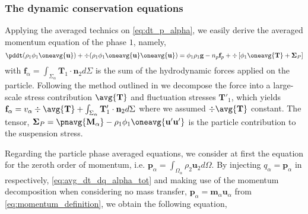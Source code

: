 \subsubsection{The dynamic conservation equations}

Applying the averaged technics on \ref{eq:dt_p_alpha}, we easily derive the averaged momentum  equation of the phase $1$, namely,
\begin{equation}
    \pddt (\rho_1\phi_1\oneavg{\textbf{u}})
    +  \div (\rho_1\phi_1\oneavg{\textbf{u}} \oneavg{\textbf{u}})
    = 
     \phi_1 \rho_1 \textbf{g}
    - n_p\textbf{f}_p
    +  \div \left[
        \phi_1\oneavg{ \textbf{T}}
        + \mathbf{\Sigma}_P
    \right]
    \label{eq:hybrid_avg_dt_rhou}
\end{equation}
with $\textbf{f}_\alpha = \int_{\Sigma_\alpha} \mathbf{T}_1 \cdot \textbf{n}_2d\Sigma$ is the sum of the hydrodynamic forces applied on the particle. 
Following the method outlined in \citet{chu2016flux} we decompose the force into a large-scale stress contribution $\avg{\textbf{T}}$ and fluctuation stresses $\textbf{T}'_1$, which yields $\textbf{f}_\alpha = v_\alpha \div\avg{\textbf{T}}+ \int_{\Sigma_\alpha} \mathbf{T}'_1 \cdot \textbf{n}_2d\Sigma$ where we assumed $\div\avg{\textbf{T}}$ constant. 
The tensor, $\mathbf{\Sigma}_P = \pnavg{\textbf{M}_\alpha} -  \rho_1\phi_1\oneavg{\textbf{u}'\textbf{u}'}$ is the particle contribution to the suspension stress.

Regarding the particle phase averaged equations, we consider at first the equation for the zeroth order of momentum, i.e. $\textbf{p}_\alpha = \int_{\Omega_\alpha} \rho_2 \textbf{u}_2 d\Omega$. 
By injecting $q_\alpha = \textbf{p}_\alpha$ in respectively, \ref{eq:avg_dt_dq_alpha_tot} and making use of the momentum decomposition when considering no mass transfer, $\textbf{p}_\alpha = \textbf{m}_\alpha \textbf{u}_\alpha$ from \ref{eq:momentum_definition},  
we obtain the following equation,

